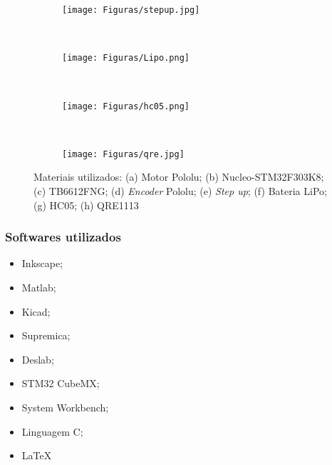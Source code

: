 \begin{frame}
\begin{figure}[noframenumbering]
     \begin{subfigure}[b]{0.2\textwidth}
 	\centering
         \texttt{[image: Figuras/stepup.jpg]}
         \caption{\centering \label{fig:b1}}
     \end{subfigure}
     ~
     \begin{subfigure}[b]{0.2\textwidth}
 	\centering
         \texttt{[image: Figuras/Lipo.png]}
         \caption{\centering \label{fig:b2}}
     \end{subfigure}
     ~
     \begin{subfigure}[b]{0.2\textwidth}
 	\centering
         \texttt{[image: Figuras/hc05.png]}
         \caption{\centering \label{fig:b3}}
     \end{subfigure}
          ~
     \begin{subfigure}[b]{0.2\textwidth}
 	\centering
         \texttt{[image: Figuras/qre.jpg]}
         \caption{\centering \label{fig:b4}}
     \end{subfigure}
     
     \caption{Materiais utilizados: (a) Motor Pololu; (b) Nucleo-STM32F303K8; (c) TB6612FNG; (d) \textit{Encoder} Pololu; (e) \textit{Step up}; (f) Bateria LiPo; (g) HC05; (h) QRE1113}     
 \end{figure}
\end{frame}

\begin{frame}
\frametitle{Softwares utilizados}

\begin{itemize}
\item Inkscape;
\item Matlab;
\item Kicad;
\item Supremica;
\item Deslab;
\item STM32 CubeMX;
\item System Workbench;
\item Linguagem C;
\item \LaTeX

\end{itemize}
\end{frame}

